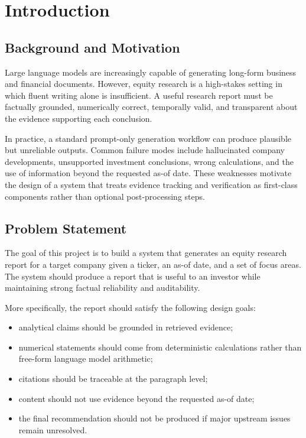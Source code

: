 \documentclass[11pt,a4paper]{article}
\begin{document}
\section{Introduction}

\subsection{Background and Motivation}
Large language models are increasingly capable of generating long-form business
and financial documents. However, equity research is a high-stakes setting in
which fluent writing alone is insufficient. A useful research report must be
factually grounded, numerically correct, temporally valid, and transparent
about the evidence supporting each conclusion.

In practice, a standard prompt-only generation workflow can produce plausible
but unreliable outputs. Common failure modes include hallucinated company
developments, unsupported investment conclusions, wrong calculations, and the
use of information beyond the requested as-of date. These weaknesses motivate
the design of a system that treats evidence tracking and verification as
first-class components rather than optional post-processing steps.

\subsection{Problem Statement}
The goal of this project is to build a system that generates an equity
research report for a target company given a ticker, an as-of date, and a set
of focus areas. The system should produce a report that is useful to an
investor while maintaining strong factual reliability and auditability.

More specifically, the report should satisfy the following design goals:
\begin{itemize}[leftmargin=1.5em]
    \item analytical claims should be grounded in retrieved evidence;
    \item numerical statements should come from deterministic calculations
    rather than free-form language model arithmetic;
    \item citations should be traceable at the paragraph level;
    \item content should not use evidence beyond the requested as-of date;
    \item the final recommendation should not be produced if major upstream
    issues remain unresolved.
\end{itemize}
\end{document}
